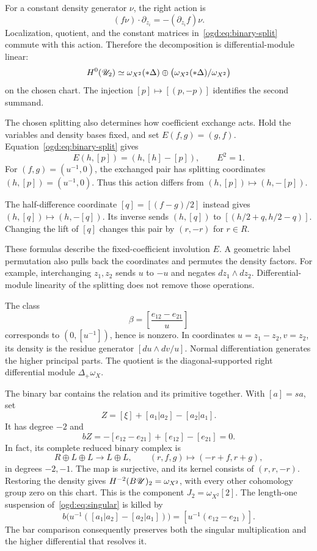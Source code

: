 For\label{ogd:def:right-density-coordinate-action} a constant density generator \(\nu\), the right action is
\[
 (f\nu)\cdot\partial_{z_i}=-(\partial_{z_i}f)\nu.
\]
Localization, quotient, and the constant matrices in~\eqref{ogd:eq:binary-split} commute with this action.
Therefore the decomposition is differential-module linear:
\[
 H^0(\mathscr U_2)\simeq\omega_{X^2}(*\Delta)
 \oplus\bigl(\omega_{X^2}(*\Delta)/\omega_{X^2}\bigr)
\]
on the chosen chart.
The injection \([p]\mapsto[(p,-p)]\) identifies the second summand.

The\label{ogd:def:fixed-coefficient-exchange} chosen splitting also determines how coefficient exchange acts.
Hold the variables and density bases fixed, and set $E(f,g)=(g,f)$.
Equation~\eqref{ogd:eq:binary-split} gives
\[
 E(h,[p])=(h,[h]-[p]),\qquad E^2=1.
\]
For $(f,g)=(u^{-1},0)$, the exchanged pair has splitting coordinates $(h,[p])=(u^{-1},0)$.
Thus this action differs from $(h,[p])\mapsto(h,-[p])$.

The half-difference coordinate $[q]=[(f-g)/2]$ instead gives $(h,[q])\mapsto(h,-[q])$.
Its inverse sends $(h,[q])$ to $[(h/2+q,h/2-q)]$.
Changing the lift of $[q]$ changes this pair by $(r,-r)$ for $r\in R$.

These formulas describe the fixed-coefficient involution $E$.
A geometric label permutation also pulls back the coordinates and permutes the density factors.
For example, interchanging $z_1,z_2$ sends $u$ to $-u$ and negates $dz_1\wedge dz_2$.
Differential-module linearity of the splitting does not remove those operations.

The class
\begin{equation}\label{ogd:eq:singular}
 \beta=\left[\frac{e_{12}-e_{21}}{u}\right]
\end{equation}
corresponds to \((0,[u^{-1}])\), hence is nonzero.
In coordinates \(u=z_1-z_2,v=z_2\), its density is the residue generator \([du\wedge dv/u]\).
Normal differentiation generates the higher principal parts.
The quotient is the diagonal-supported right differential module \(\Delta_+\omega_X\).

The\label{ogd:def:binary-bar-cycle} binary bar contains the relation and its primitive together.
With \([a]=sa\), set
\[
 Z=[\xi]+[a_1|a_2]-[a_2|a_1].
\]
It has degree \(-2\) and
\[
 bZ=-[e_{12}-e_{21}]+[e_{12}]-[e_{21}]=0.
\]
In fact, its complete reduced binary complex is
\begin{equation}\label{ogd:eq:binary-bar}
 R\oplus L\oplus L\longrightarrow L\oplus L,
 \qquad (r,f,g)\longmapsto(-r+f,r+g),
\end{equation}
in degrees \(-2,-1\).
The map is surjective, and its kernel consists of \((r,r,-r)\).
Restoring the density gives \(H^{-2}(B\mathscr U)_2=\omega_{X^2}\), with every other cohomology group zero on this chart.
This is the component \(J_2=\omega_{X^2}[2]\).
The length-one suspension of~\eqref{ogd:eq:singular} is killed by
\[
 b\bigl(u^{-1}([a_1|a_2]-[a_2|a_1])\bigr)
       =[u^{-1}(e_{12}-e_{21})].
\]
The bar comparison consequently preserves both the singular multiplication and the higher differential that resolves it.

